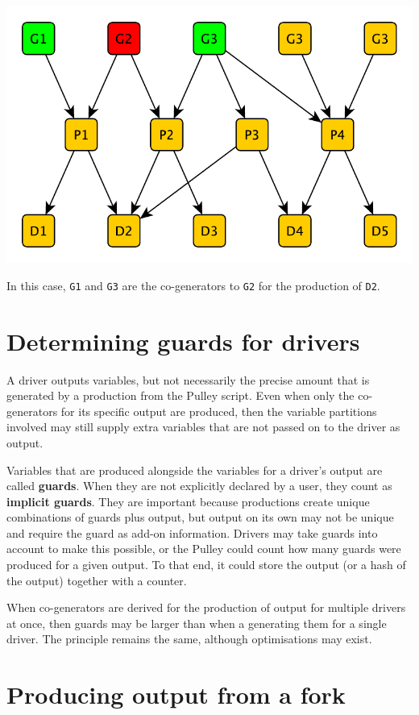 \documentclass[a4paper]{article}
\def\G#1{\texttt{G#1}\xspace}
\def\D#1{\texttt{D#1}\xspace}
\begin{document}
\centerline{\includegraphics[scale=0.5]{img/network5-gensneeded-w2.pdf}}

In this case, \G1 and \G3 are the co-generators to \G2 for the production of \D2.

\section{Determining guards for drivers}

A driver outputs variables, but not necessarily the precise amount that is generated by a production from the Pulley script. Even when only the co-generators for its specific output are produced, then the variable partitions involved may still supply extra variables that are not passed on to the driver as output.

Variables that are produced alongside the variables for a driver's output are called \textbf{guards}.  When they are not explicitly declared by a user, they count as \textbf{implicit guards}.  They are important because productions create unique combinations of guards plus output, but output on its own may not be unique and require the guard as add-on information.  Drivers may take guards into account to make this possible, or the Pulley could count how many guards were produced for a given output.  To that end, it could store the output (or a hash of the output) together with a counter.

When co-generators are derived for the production of output for multiple drivers at once, then guards may be larger than when a generating them for a single driver.  The principle remains the same, although optimisations may exist.

\section{Producing output from a fork}
\end{document}
